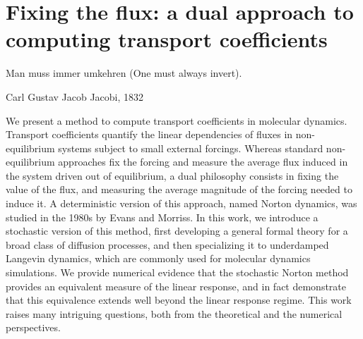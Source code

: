 \chapter{Fixing the flux: a dual approach to computing transport coefficients}
\label{chap:norton}
\epigraph{Man muss immer umkehren (One must always invert).}{Carl Gustav Jacob Jacobi, 1832}

\begin{chapterabstract}
    We present a method to compute transport coefficients in molecular dynamics. Transport coefficients quantify the linear dependencies of fluxes in non-equilibrium systems subject to small external forcings. Whereas standard non-equilibrium approaches fix the forcing and measure the average flux induced in the system driven out of equilibrium, a dual philosophy consists in fixing the value of the flux, and measuring the average magnitude of the forcing needed to induce it. A deterministic version of this approach, named Norton dynamics, was studied in the 1980s by Evans and Morriss. In this work, we introduce a stochastic version of this method, first developing a general formal theory for a broad class of diffusion processes, and then specializing it to underdamped Langevin dynamics, which are commonly used for molecular dynamics simulations.
We provide numerical evidence that the stochastic Norton method provides an equivalent measure of the linear response, and in fact demonstrate that this equivalence extends well beyond the linear response regime.
This work raises many intriguing questions, both from the theoretical and the numerical perspectives.
\end{chapterabstract}

